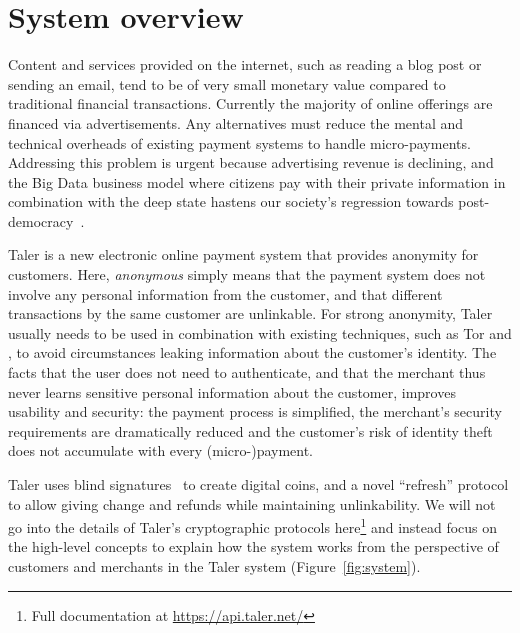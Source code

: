 \documentclass[twoside,letterpaper]{sigalternate}
\begin{document}
\maketitle

\section{System overview}

Content and services provided on the internet, such as reading a blog post or
sending an email, tend to be of very small monetary value compared to
traditional financial transactions.  Currently the majority of online offerings
are financed via advertisements.  Any alternatives must reduce the mental
and technical overheads of existing payment systems to handle micro-payments.
Addressing this problem is urgent because advertising revenue is declining,
and the Big Data business model where citizens pay with their
private information in combination with the deep state hastens our society's
regression towards post-democracy~\cite{rms2013democracy}.

Taler is a new electronic online payment system that provides
anonymity for customers.  Here, {\em anonymous} simply means that the
payment system does not involve any personal information from the
customer, and that different transactions by the same customer are
unlinkable.  For strong anonymity, Taler usually needs to be used in
combination with existing techniques, such as Tor and \cite{apod}, to
avoid circumstances leaking information about the customer's identity.
The facts that the user does not need to authenticate, and that the merchant
thus never learns sensitive personal information about the customer,
improves usability and security: the payment process is simplified, the
merchant's security requirements are dramatically reduced and the customer's
risk of identity theft does not accumulate with every (micro-)payment.

Taler uses blind signatures~\cite{chaum1983blind} to create digital
coins, and a novel ``refresh'' protocol to allow giving change and
refunds while maintaining unlinkability.  We will not go into the
details of Taler's cryptographic protocols here\footnote{Full
documentation at \url{https://api.taler.net/}} and instead focus on the
high-level concepts to explain how the system works from the
perspective of customers and merchants in the Taler
system (Figure~\ref{fig:system}).
\end{document}
